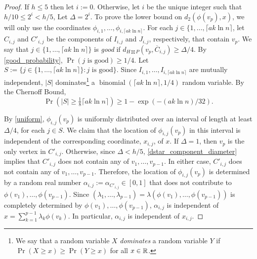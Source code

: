 \documentclass{patmorin}
\renewcommand{\ge}{\geqslant}
\renewcommand{\le}{\leqslant}
\newcommand{\defin}[1]{\emph{\textcolor{brightmaroon}{#1}}}
\begin{document}
\begin{proof}
  If $h \le 5$ then let $i:=0$.  Otherwise, let $i$ be the unique integer such that $h/10\le 2^i < h/5$, Let $\Delta=2^i$.  To prove the lower bound on $d_2(\phi(v_p),x)$, we will only use the coordinates $\phi_{i,1},\ldots,\phi_{i,\lceil a k\ln n\rceil}$.  For each $j\in\{1,\ldots,\lceil ak\ln n\rceil$, let $C_{i,j}$ and $C'_{i,j}$ be the components of $I_{i,j}$ and $J_{i,j}$, respectively, that contain $v_p$. We say that $j\in\{1,\ldots,\lceil a k\ln n\rceil\}$ is \defin{good} if $d_{H\boxtimes P}(v_p,\overline{C}_{i,j})\ge \Delta/4$.  By \cref{good_probability},  $\Pr(\text{$j$ is good})\ge 1/4$. Let $S:=\{j\in\{1,\ldots,\lceil a k\ln n\rceil\}:\text{$j$ is good}\}$.  Since $I_{i,1},\ldots,I_{i,\lceil a k\ln n\rceil}$ are mutually independent, $|S|$ dominates\footnote{We say that a random variable $X$ \defin{dominates} a random variable $Y$ if $\Pr(X\ge x)\ge\Pr(Y\ge x)$ for all $x\in\mathbb{R}$.} a $\operatorname{binomial}(\lceil a k\ln n\rceil,1/4)$ random variable. By the Chernoff Bound,
  $$\Pr(|S|\ge \tfrac{1}{8}\lceil a k\ln n\rceil)\ge 1-\exp(-(ak\ln n)/32).$$

  By \cref{uniform}, $\phi_{i,j}(v_p)$ is uniformly distributed over an interval of length at least $\Delta/4$, for each $j\in S$.  We claim that the location of $\phi_{i,j}(v_p)$ in this interval is independent of the corresponding coordinate, $x_{i,j}$, of $x$.  If $\Delta=1$, then $v_p$ is the only vertex in $C'_{i,j}$.  Otherwise, since $\Delta<h/5$, \cref{dstar_component_diameter} implies that $C'_{i,j}$ does not contain any of $v_1,\ldots,v_{p-1}$. In either case, $C'_{i,j}$ does not contain any of $v_1,\ldots,v_{p-1}$.  Therefore, the location of $\phi_{i,j}(v_p)$ is determined by a random real number $\alpha_{i,j}:=\alpha_{C'_{i,j}}\in[0,1]$ that does not contribute to $\phi(v_1),\ldots,\phi(v_{p-1})$.  Since $(\lambda_1,\ldots,\lambda_{p-1})=\lambda(\phi(v_1),\ldots,\phi(v_{p-1}))$ is completely determined by $\phi(v_1),\ldots,\phi(v_{p-1})$, $\alpha_{i,j}$ is independent of $x=\sum_{k=1}^{p-1}\lambda_k\phi(v_k)$.  In particular, $\alpha_{i,j}$ is independent of $x_{i,j}$.


\end{proof}
\end{document}
